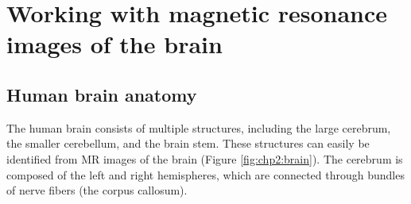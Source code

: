 \chapter{Working with magnetic resonance images of the brain}
\label{chp:chp2}

\section{Human brain anatomy}
\label{sec:chp2:anatomy}

The human brain consists of multiple structures, including the large
cerebrum, the smaller cerebellum, and the brain stem. These structures
can easily be identified from MR images of the
brain (Figure \ref{fig:chp2:brain}). The cerebrum is composed of the
left and right hemispheres, which are connected through bundles of
nerve fibers (the corpus callosum).


